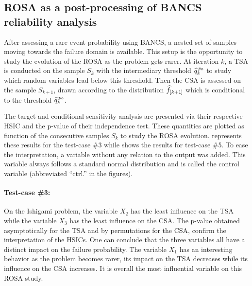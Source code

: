 \subsection{ROSA as a post-processing of BANCS reliability analysis}

After assessing a rare event probability using BANCS, a nested set of samples moving towards the failure domain is available.
This setup is the opportunity to study the evolution of the ROSA as the problem gets rarer.
At iteration $k$, a TSA is conducted on the sample $S_k$ with the intermediary threshold $\widehat{q}^{\, p_0}_k$ to study which random variables lead below this threshold. 
Then the CSA is assessed on the sample $S_{k+1}$, drawn according to the distribution $\widehat{f}_{[k+1]}$ which is conditional to the threshold $\widehat{q}^{\, p_0}_k$. 

The target and conditional sensitivity analysis are presented via their respective HSIC and the p-value of their independence test.  
These quantities are plotted as function of the consecutive samples $S_k$ to study the ROSA evolution. 
 represents these results for the test-case \#3 while  shows the results for test-case \#5. 
To ease the interpretation, a variable without any relation to the output was added. 
This variable always follows a standard normal distribution and is called the control variable (abbreviated ``ctrl.'' in the figures). 

\paragraph{Test-case \#3:}
On the Ishigami problem, the variable $X_2$ has the least influence on the TSA while the variable $X_3$ has the least influence on the CSA. 
The p-value obtained asymptotically for the TSA and by permutations for the CSA, confirm the interpretation of the HSICs. 
One can conclude that the three variables all have a distinct impact on the failure probability. 
The variable $X_1$ has an interesting behavior as the problem becomes rarer, its impact on the TSA decreases while its influence on the CSA increases.      
It is overall the most influential variable on this ROSA study.  

